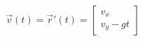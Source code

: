 \documentclass[preview]{standalone}
\begin{document}
\begin{align*}
\vec{v}(t) = \vec{r}'(t) = \begin{bmatrix} v_x \\ v_y - gt \end{bmatrix}
\end{align*}
\end{document}
